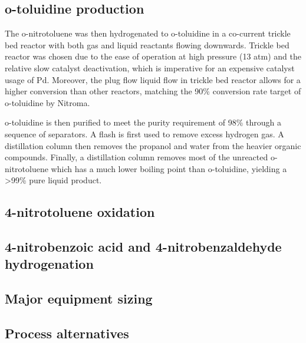 \subsection{o-toluidine production}
The o-nitrotoluene was then hydrogenated to o-toluidine in a co-current trickle bed reactor with both gas and liquid reactants flowing downwards. Trickle bed reactor was chosen due to the ease of operation at high pressure (13 atm) and the relative slow catalyst deactivation, which is imperative for an expensive catalyst usage of Pd. Moreover, the plug flow liquid flow in trickle bed reactor allows for a higher conversion than other reactors, matching  the 90\% conversion rate target of o-toluidine by Nitroma. 

o-toluidine is then purified to meet the purity requirement of 98\% through a sequence of separators. A flash is first used to remove excess hydrogen gas. A distillation column then removes the propanol and water from the heavier organic compounds. Finally, a distillation column removes most of the unreacted o-nitrotoluene which has a much lower boiling point than o-toluidine, yielding a >99\% pure liquid product.
 

\subsection{4-nitrotoluene oxidation}

\subsection{4-nitrobenzoic acid and 4-nitrobenzaldehyde hydrogenation}


\subsection{Major equipment sizing}

\subsection{Process alternatives}


